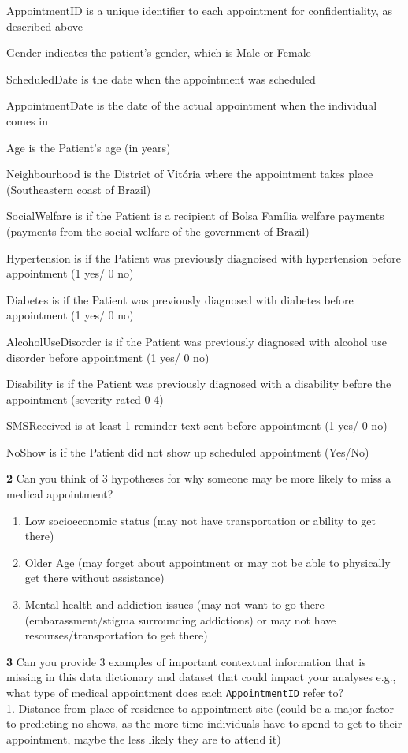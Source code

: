 \documentclass[
]{article}
\begin{document}
AppointmentID is a unique identifier to each appointment for
confidentiality, as described above

Gender indicates the patient's gender, which is Male or Female

ScheduledDate is the date when the appointment was scheduled

AppointmentDate is the date of the actual appointment when the
individual comes in

Age is the Patient's age (in years)

Neighbourhood is the District of Vitória where the appointment takes
place (Southeastern coast of Brazil)

SocialWelfare is if the Patient is a recipient of Bolsa Família welfare
payments (payments from the social welfare of the government of Brazil)

Hypertension is if the Patient was previously diagnoised with
hypertension before appointment (1 yes/ 0 no)

Diabetes is if the Patient was previously diagnosed with diabetes before
appointment (1 yes/ 0 no)

AlcoholUseDisorder is if the Patient was previously diagnosed with
alcohol use disorder before appointment (1 yes/ 0 no)

Disability is if the Patient was previously diagnosed with a disability
before the appointment (severity rated 0-4)

SMSReceived is at least 1 reminder text sent before appointment (1 yes/
0 no)

NoShow is if the Patient did not show up scheduled appointment (Yes/No)

\textbf{2} Can you think of 3 hypotheses for why someone may be more
likely to miss a medical appointment?

\begin{enumerate}
\def\labelenumi{\arabic{enumi}.}
\item
  Low socioeconomic status (may not have transportation or ability to
  get there)
\item
  Older Age (may forget about appointment or may not be able to
  physically get there without assistance)
\item
  Mental health and addiction issues (may not want to go there
  (embarassment/stigma surrounding addictions) or may not have
  resourses/transportation to get there)
\end{enumerate}

\textbf{3} Can you provide 3 examples of important contextual
information that is missing in this data dictionary and dataset that
could impact your analyses e.g., what type of medical appointment does
each \texttt{AppointmentID} refer to?\\
1. Distance from place of residence to appointment site (could be a
major factor to predicting no shows, as the more time individuals have
to spend to get to their appointment, maybe the less likely they are to
attend it)
\end{document}
